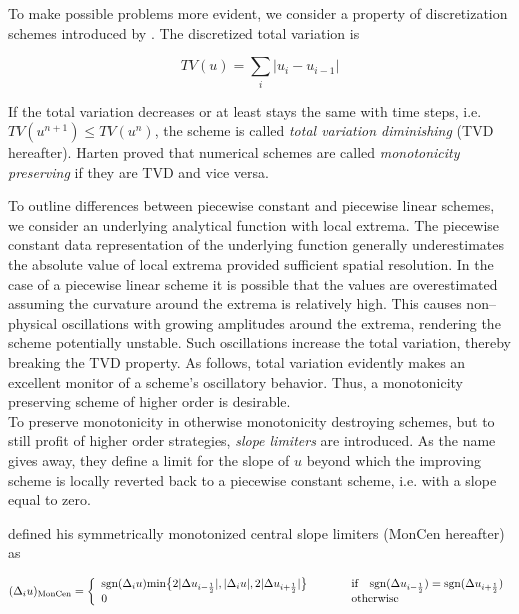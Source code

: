 To make possible problems more evident, we consider a property of discretization schemes introduced by \citet{Harten_TVD}.
The discretized total variation is

\begin{equation}
  TV(u) = \sum_{i} \vert u_{i} - u_{i-1}\vert
\end{equation}

If the total variation decreases or at least stays the same with time steps, i.e. $TV(u^{n+1}) \leq TV(u^{n})$, the scheme is called \textit{total variation diminishing} (TVD hereafter).
Harten proved that numerical schemes are called \textit{monotonicity preserving} if they are TVD and vice versa.

To outline differences between piecewise constant and piecewise linear schemes, we consider an underlying analytical function with local extrema.
The piecewise constant data representation of the underlying function generally underestimates the absolute value of local extrema provided sufficient spatial resolution.
In the case of a piecewise linear scheme it is possible that the values are overestimated assuming the curvature around the extrema is relatively high.
This causes non--physical oscillations with growing amplitudes around the extrema, rendering the scheme potentially unstable.
Such oscillations increase the total variation, thereby breaking the TVD property.
As follows, total variation evidently makes an excellent monitor of a scheme's oscillatory behavior.
Thus, a monotonicity preserving scheme of higher order is desirable.
\\[6pt]
%
To preserve monotonicity in otherwise monotonicity destroying schemes, but to still profit of higher order strategies, \textit{slope limiters} are introduced.
As the name gives away, they define a limit for the slope of $u$ beyond which the improving scheme is locally reverted back to a piecewise constant scheme, i.e. with a slope equal to zero.

\citet{vanLeer_fluxlimiter} defined his symmetrically monotonized central slope limiters (MonCen hereafter) as

\begin{equation}
  (\Delta_{i} u)_{\text{MonCen}} = \left\{\begin{array}{l l}
                                    \text{sgn}(\Delta_{i} u)\text{min}\big\{ 2\vert\Delta u_{i-\frac{1}{2}}\vert, \vert\Delta_{i} u\vert, 2\vert\Delta u_{i+\frac{1}{2}}\vert \big\} \hspace{1cm} & \text{if} \quad \text{sgn}(\Delta u_{i-\frac{1}{2}}) = \text{sgn}(\Delta u_{i+\frac{1}{2}}) \\
                                    0 \hspace{1cm} &\text{otherwise}
                                   \end{array}\right.
\end{equation}

